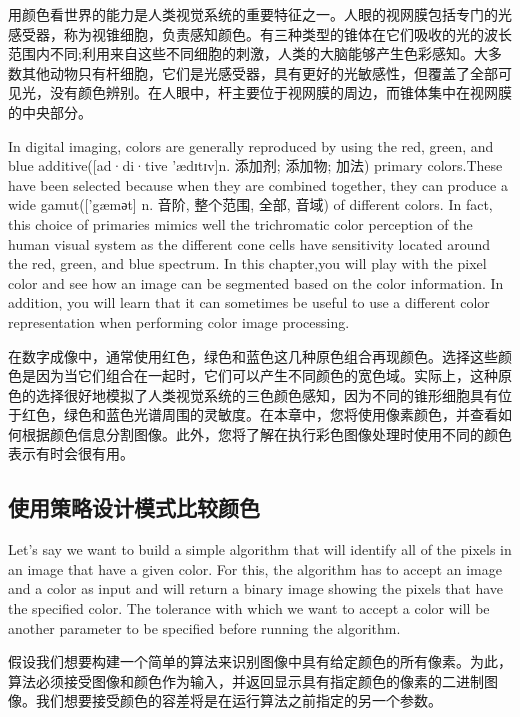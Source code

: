 \documentclass[]{article}
\begin{document}
用颜色看世界的能力是人类视觉系统的重要特征之一。人眼的视网膜包括专门的光感受器，称为视锥细胞，负责感知颜色。有三种类型的锥体在它们吸收的光的波长范围内不同;利用来自这些不同细胞的刺激，人类的大脑能够产生色彩感知。大多数其他动物只有杆细胞，它们是光感受器，具有更好的光敏感性，但覆盖了全部可见光，没有颜色辨别。在人眼中，杆主要位于视网膜的周边，而锥体集中在视网膜的中央部分。

In digital imaging, colors are generally reproduced by using the red,
green, and blue additive({[}ad·di·tive \textbar{}\textbar{} 'ædɪtɪv{]}n.
添加剂; 添加物; 加法) primary colors.These have been selected because
when they are combined together, they can produce a wide
gamut({[}'gæmәt{]} n. 音阶, 整个范围, 全部, 音域) of different colors.
In fact, this choice of primaries mimics well the trichromatic color
perception of the human visual system as the different cone cells have
sensitivity located around the red, green, and blue spectrum. In this
chapter,you will play with the pixel color and see how an image can be
segmented based on the color information. In addition, you will learn
that it can sometimes be useful to use a different color representation
when performing color image processing.

在数字成像中，通常使用红色，绿色和蓝色这几种原色组合再现颜色。选择这些颜色是因为当它们组合在一起时，它们可以产生不同颜色的宽色域。实际上，这种原色的选择很好地模拟了人类视觉系统的三色颜色感知，因为不同的锥形细胞具有位于红色，绿色和蓝色光谱周围的灵敏度。在本章中，您将使用像素颜色，并查看如何根据颜色信息分割图像。此外，您将了解在执行彩色图像处理时使用不同的颜色表示有时会很有用。

\hypertarget{header-n1162}{%
\subsection{使用策略设计模式比较颜色}\label{header-n1162}}

Let's say we want to build a simple algorithm that will identify all of
the pixels in an image that have a given color. For this, the algorithm
has to accept an image and a color as input and will return a binary
image showing the pixels that have the specified color. The tolerance
with which we want to accept a color will be another parameter to be
specified before running the algorithm.

假设我们想要构建一个简单的算法来识别图像中具有给定颜色的所有像素。为此，算法必须接受图像和颜色作为输入，并返回显示具有指定颜色的像素的二进制图像。我们想要接受颜色的容差将是在运行算法之前指定的另一个参数。
\end{document}
